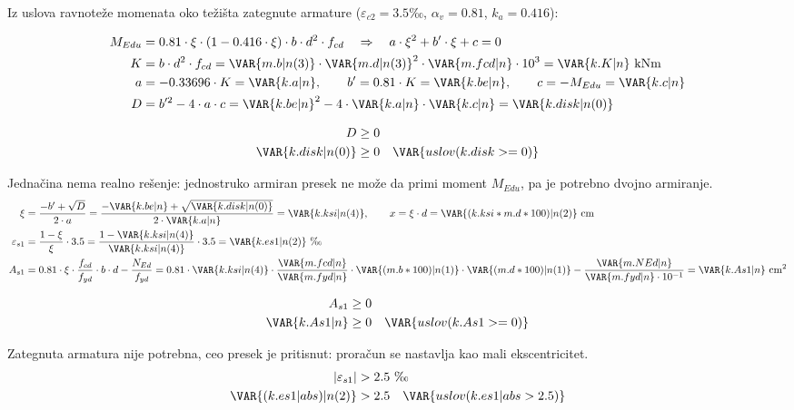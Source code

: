Iz uslova ravnoteže momenata oko težišta zategnute armature ($\varepsilon_{c2} = 3.5$‰, $\alpha_v = 0.81$, $k_a = 0.416$):

\begin{align*}
M_{Edu} &= 0.81 \cdot \xi \cdot (1 - 0.416 \cdot \xi) \cdot b \cdot d^2 \cdot f_{cd} \quad \Rightarrow \quad a \cdot \xi^2 + b' \cdot \xi + c = 0 \\
K &= b \cdot d^2 \cdot f_{cd} = \VAR{m.b|n(3)} \cdot \VAR{m.d|n(3)}^2 \cdot \VAR{m.fcd|n} \cdot 10^3 = \VAR{k.K|n} \ \mathrm{kNm} \\
a &= -0.33696 \cdot K = \VAR{k.a|n}, \qquad b' = 0.81 \cdot K = \VAR{k.be|n}, \qquad c = -M_{Edu} = \VAR{k.c|n} \\
D &= b'^2 - 4 \cdot a \cdot c = \VAR{k.be|n}^2 - 4 \cdot \VAR{k.a|n} \cdot \VAR{k.c|n} = \VAR{k.disk|n(0)}
\end{align*}

\begin{align*}
D &\geq 0 \\
\VAR{k.disk|n(0)} &\geq 0 \quad \VAR{uslov(k.disk >= 0)}
\end{align*}

Jednačina nema realno rešenje: jednostruko armiran presek ne može da primi moment $M_{Edu}$, pa je potrebno dvojno armiranje.
\begin{align*}
\xi &= \frac{-b' + \sqrt{D}}{2 \cdot a} = \frac{-\VAR{k.be|n} + \sqrt{\VAR{k.disk|n(0)}}}{2 \cdot \VAR{k.a|n}} = \VAR{k.ksi|n(4)}, \qquad x = \xi \cdot d = \VAR{(k.ksi*m.d*100)|n(2)} \ \mathrm{cm} \\
\varepsilon_{s1} &= \frac{1 - \xi}{\xi} \cdot 3.5 = \frac{1 - \VAR{k.ksi|n(4)}}{\VAR{k.ksi|n(4)}} \cdot 3.5 = \VAR{k.es1|n(2)} \ \text{‰} \\
A_{s1} &= 0.81 \cdot \xi \cdot \frac{f_{cd}}{f_{yd}} \cdot b \cdot d - \frac{N_{Ed}}{f_{yd}} = 0.81 \cdot \VAR{k.ksi|n(4)} \cdot \frac{\VAR{m.fcd|n}}{\VAR{m.fyd|n}} \cdot \VAR{(m.b*100)|n(1)} \cdot \VAR{(m.d*100)|n(1)} - \frac{\VAR{m.NEd|n}}{\VAR{m.fyd|n} \cdot 10^{-1}} = \VAR{k.As1|n} \ \mathrm{cm^2}
\end{align*}

\begin{align*}
A_{s1} &\geq 0 \\
\VAR{k.As1|n} &\geq 0 \quad \VAR{uslov(k.As1 >= 0)}
\end{align*}

Zategnuta armatura nije potrebna, ceo presek je pritisnut: proračun se nastavlja kao mali ekscentricitet.
\begin{align*}
|\varepsilon_{s1}| &> 2.5 \ \text{‰} \\
\VAR{(k.es1|abs)|n(2)} &> 2.5 \quad \VAR{uslov(k.es1|abs > 2.5)}
\end{align*}

